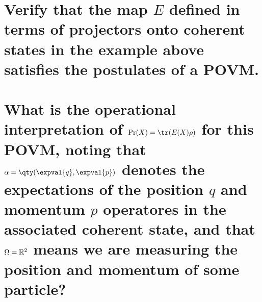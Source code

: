 \documentclass[
	pages,
	boxes,
	color=RoyalPurple
]{homework}
\makeatletter
\numberwithin{tcb@cnt@prob}{section}
\makeatother
\begin{document}
\begin{problem}
\begin{parts}
    \part{Verify that the map $E$ defined in terms of projectors onto coherent states in the example above satisfies the postulates of a \ac{POVM}.}\label{part:33a}
    \part{What is the operational interpretation of $\Pr(X) = \tr(E(X)\rho)$ for this \ac{POVM}, noting that $\alpha = \qty(\expval{q}, \expval{p})$ denotes the expectations of the position $q$ and momentum $p$ operatores in the associated coherent state, and that $\Omega = \mathbb{R}^2$ means we are measuring the position and momentum of some particle?}
\end{parts}
\end{problem}

\begin{solution}
\end{solution}
\end{document}
